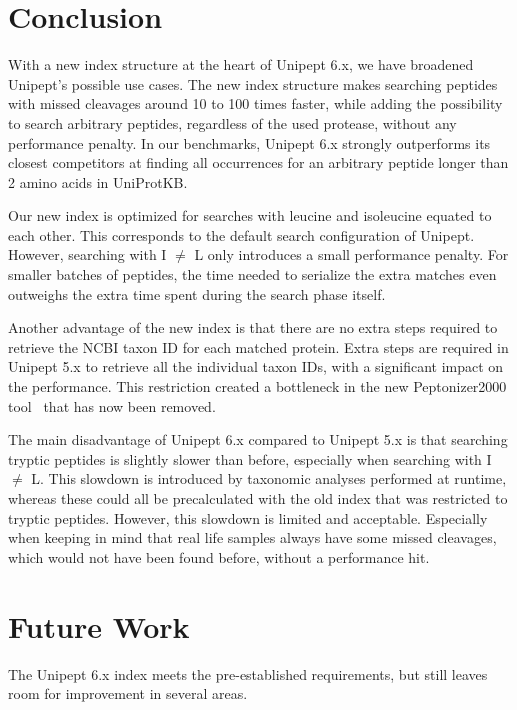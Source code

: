 \documentclass[11pt]{article}
\begin{document}
\begin{multicols}{2}
        \section{Conclusion}\label{sec:discussion}
        With a new index structure at the heart of Unipept 6.x, we have broadened Unipept's possible use cases.
        The new index structure makes searching peptides with missed cleavages around 10 to 100 times faster, while adding the possibility to search arbitrary peptides, regardless of the used protease, without any performance penalty.
        In our benchmarks, Unipept 6.x strongly outperforms its closest competitors at finding all occurrences for an arbitrary peptide longer than 2 amino acids in UniProtKB\@.

        Our new index is optimized for searches with leucine and isoleucine equated to each other.
        This corresponds to the default search configuration of Unipept.
        However, searching with I $\neq$ L only introduces a small performance penalty.
        For smaller batches of peptides, the time needed to serialize the extra matches even outweighs the extra time spent during the search phase itself.

        Another advantage of the new index is that there are no extra steps required to retrieve the NCBI taxon ID for each matched protein.
        Extra steps are required in Unipept 5.x to retrieve all the individual taxon IDs, with a significant impact on the performance.
        This restriction created a bottleneck in the new Peptonizer2000 tool~\cite{pep_gm} that has now been removed.

        The main disadvantage of Unipept 6.x compared to Unipept 5.x is that searching tryptic peptides is slightly slower than before, especially when searching with I $\neq$ L\@.
        This slowdown is introduced by taxonomic analyses performed at runtime, whereas these could all be precalculated with the old index that was restricted to tryptic peptides.
        However, this slowdown is limited and acceptable.
        Especially when keeping in mind that real life samples always have some missed cleavages, which would not have been found before, without a performance hit.

        \section{Future Work}
        The Unipept 6.x index meets the pre-established requirements, but still leaves room for improvement in several areas.


\end{multicols}
\end{document}
